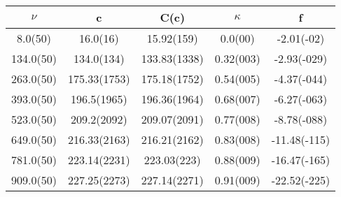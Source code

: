 \begin{table}[H]
	\centering
	\begin{tabular}{ccccc}
		$\nu$ & c & C(c) & $\kappa$ & f\\
		\hline
		8.0(50) & 16.0(16) & 15.92(159) & 0.0(00) & -2.01(-02)	\\
		134.0(50) & 134.0(134) & 133.83(1338) & 0.32(003) & -2.93(-029)	\\
		263.0(50) & 175.33(1753) & 175.18(1752) & 0.54(005) & -4.37(-044)	\\
		393.0(50) & 196.5(1965) & 196.36(1964) & 0.68(007) & -6.27(-063)	\\
		523.0(50) & 209.2(2092) & 209.07(2091) & 0.77(008) & -8.78(-088)	\\
		649.0(50) & 216.33(2163) & 216.21(2162) & 0.83(008) & -11.48(-115)	\\
		781.0(50) & 223.14(2231) & 223.03(223) & 0.88(009) & -16.47(-165)	\\
		909.0(50) & 227.25(2273) & 227.14(2271) & 0.91(009) & -22.52(-225)	\\
	\end{tabular}
\end{table}
